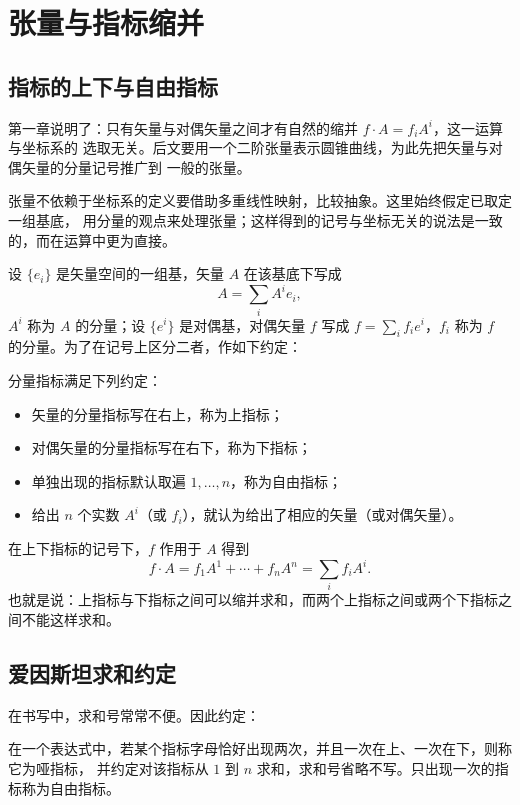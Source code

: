 \chapter{张量与指标缩并}

\section{指标的上下与自由指标}

第一章说明了：只有矢量与对偶矢量之间才有自然的缩并 $f\cdot A=f_iA^i$，这一运算与坐标系的
选取无关。后文要用一个二阶张量表示圆锥曲线，为此先把矢量与对偶矢量的分量记号推广到
一般的张量。

张量不依赖于坐标系的定义要借助多重线性映射，比较抽象。这里始终假定已取定一组基底，
用分量的观点来处理张量；这样得到的记号与坐标无关的说法是一致的，而在运算中更为直接。

设 $\{e_i\}$ 是矢量空间的一组基，矢量 $A$ 在该基底下写成
\[
A=\sum_i A^i e_i ,
\]
$A^i$ 称为 $A$ 的分量；设 $\{e^i\}$ 是对偶基，对偶矢量 $f$ 写成 $f=\sum_i f_i e^i$，$f_i$
称为 $f$ 的分量。为了在记号上区分二者，作如下约定：

\begin{definition}[上下指标的约定]
分量指标满足下列约定：
\begin{itemize}
\item 矢量的分量指标写在右上，称为上指标；
\item 对偶矢量的分量指标写在右下，称为下指标；
\item 单独出现的指标默认取遍 $1,\dots,n$，称为自由指标；
\item 给出 $n$ 个实数 $A^i$（或 $f_i$），就认为给出了相应的矢量（或对偶矢量）。
\end{itemize}
\end{definition}

在上下指标的记号下，$f$ 作用于 $A$ 得到
\[
f\cdot A=f_1A^1+\cdots+f_nA^n=\sum_i f_iA^i .
\]
也就是说：上指标与下指标之间可以缩并求和，而两个上指标之间或两个下指标之间不能这样求和。

\section{爱因斯坦求和约定}

在书写中，求和号常常不便。因此约定：

\begin{definition}[爱因斯坦求和约定]
在一个表达式中，若某个指标字母恰好出现两次，并且一次在上、一次在下，则称它为哑指标，
并约定对该指标从 $1$ 到 $n$ 求和，求和号省略不写。只出现一次的指标称为自由指标。
\end{definition}

